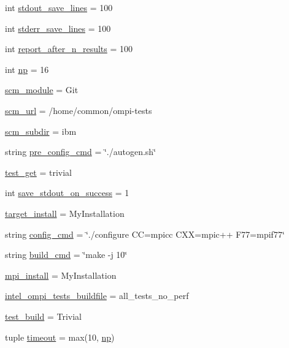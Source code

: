 \begin{DoxyCompactItemize}
int \hyperlink{namespacetest_ad4c8d1b4c04f99668eb1f7168aee5dec}{stdout\-\_\-save\-\_\-lines} = 100
\item 
int \hyperlink{namespacetest_a6eb3ee4197f9fe28682af6f06cbc5e8f}{stderr\-\_\-save\-\_\-lines} = 100
\item 
int \hyperlink{namespacetest_a86e28e32de6c6c5e79ed64d05f513b97}{report\-\_\-after\-\_\-n\-\_\-results} = 100
\item 
int \hyperlink{namespacetest_a1535a7960a63eaf5e78bb6685abd44e8}{np} = 16
\item 
\hyperlink{namespacetest_a9c562b60dd319bbf228d80c2285c3fde}{scm\-\_\-module} = Git
\item 
\hyperlink{namespacetest_a6eab9a211bdeacabe249075b1612c3d9}{scm\-\_\-url} = /home/common/ompi-\/tests
\item 
\hyperlink{namespacetest_a954686f4e1dc4fd9b53353f75443c6a1}{scm\-\_\-subdir} = ibm
\item 
string \hyperlink{namespacetest_a96c17bd039b26da494c806d745289285}{pre\-\_\-config\-\_\-cmd} = \char`\"{}./autogen.\-sh\char`\"{}
\item 
\hyperlink{namespacetest_aed30062928699cb82ebdc01629cc1ec2}{test\-\_\-get} = trivial
\item 
int \hyperlink{namespacetest_a222c8f53a587af9263d043662a13938b}{save\-\_\-stdout\-\_\-on\-\_\-success} = 1
\item 
\hyperlink{namespacetest_a567f95611fb12515b764d829ae44aabb}{target\-\_\-install} = My\-Installation
\item 
string \hyperlink{namespacetest_a94ef7b9eb439fa68dbcb5ffd2b3247d2}{config\-\_\-cmd} = \char`\"{}./configure C\-C=mpicc C\-X\-X=mpic++ F77=mpif77\char`\"{}
\item 
string \hyperlink{namespacetest_aaa8f1db02a6b0b450565529cebd91d5c}{build\-\_\-cmd} = \char`\"{}make -\/j 10\char`\"{}
\item 
\hyperlink{namespacetest_a295e67a63678237853b86e59182db440}{mpi\-\_\-install} = My\-Installation
\item 
\hyperlink{namespacetest_ae4fd57c0f20abaa78ea8f6e1a2dd6625}{intel\-\_\-ompi\-\_\-tests\-\_\-buildfile} = all\-\_\-tests\-\_\-no\-\_\-perf
\item 
\hyperlink{namespacetest_aec036affe0d08e5c43462900a6548769}{test\-\_\-build} = Trivial
\item 
tuple \hyperlink{namespacetest_a69079090d6416ccf53f5c565fa229a77}{timeout} = max(10, \hyperlink{namespacetest_a1535a7960a63eaf5e78bb6685abd44e8}{np})
\item 

\end{DoxyCompactItemize}
